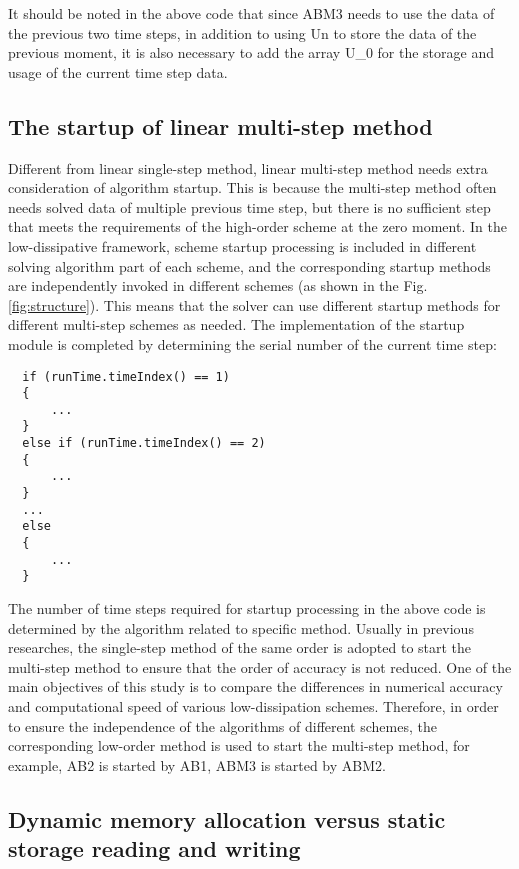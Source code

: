 \documentclass{article}
\begin{document}
It should be noted in the above code that since ABM3 needs to use the data of the previous two time steps, in addition to using Un to store the data of the previous moment, it is also necessary to add the array U\_0 for the storage and usage of the current time step data.


\subsection{The startup of linear multi-step method}

Different from linear single-step method, linear multi-step method needs extra consideration of algorithm startup. This is because the multi-step method often needs solved data of multiple previous time step, but there is no sufficient step that meets the requirements of the high-order scheme at the zero moment. In the low-dissipative framework, scheme startup processing is included in different solving algorithm part of each scheme, and the corresponding startup methods are independently invoked in different schemes (as shown in the Fig.\ref{fig:structure}). This means that the solver can use different startup methods for different multi-step schemes as needed. The implementation of the startup module is completed by determining the serial number of the current time step:

\begin{lstlisting}
  if (runTime.timeIndex() == 1)
  {
      ...
  }
  else if (runTime.timeIndex() == 2)
  {
      ...
  }
  ...
  else
  {
      ...
  }
\end{lstlisting}

The number of time steps required for startup processing in the above code is determined by the algorithm related to specific method. Usually in previous researches, the single-step method of the same order is adopted to start the multi-step method to ensure that the order of accuracy is not reduced. One of the main objectives of this study is to compare the differences in numerical accuracy and computational speed of various low-dissipation schemes. Therefore, in order to ensure the independence of the algorithms of different schemes, the corresponding low-order method is used to start the multi-step method, for example, AB2 is started by AB1, ABM3 is started by ABM2.


\subsection{Dynamic memory allocation versus static storage reading and writing}
\label{ssec:memory}
\end{document}
